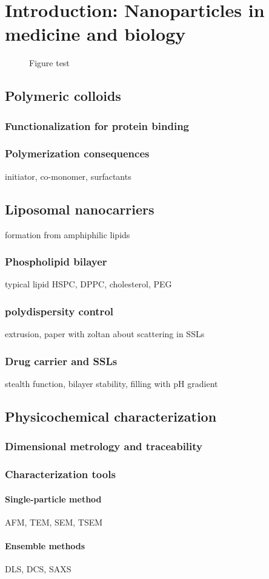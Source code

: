 \chapter{Introduction: Nanoparticles in medicine and biology}
\label{chap:introduction}
\blindtext[1]\cite{araki_resonant_2006}
\begin{figure}
	\begin{center}
		
	\end{center}
	\caption{Figure test}
\end{figure}

\section{Polymeric colloids}
\subsection{Functionalization for protein binding}

\subsection{Polymerization consequences}
initiator, co-monomer, surfactants

\section{Liposomal nanocarriers}
formation from amphiphilic lipids
\subsection{Phospholipid bilayer}
typical lipid HSPC, DPPC, cholesterol, PEG

\subsection{polydispersity control}
extrusion, paper with zoltan about scattering in SSLs

\subsection{Drug carrier and SSLs}
stealth function, bilayer stability, filling with pH gradient

\section{Physicochemical characterization}
\subsection{Dimensional metrology and traceability}

\subsection{Characterization tools}
\subsubsection{Single-particle method}
AFM, TEM, SEM, TSEM

\subsubsection{Ensemble methods}
DLS, DCS, SAXS


